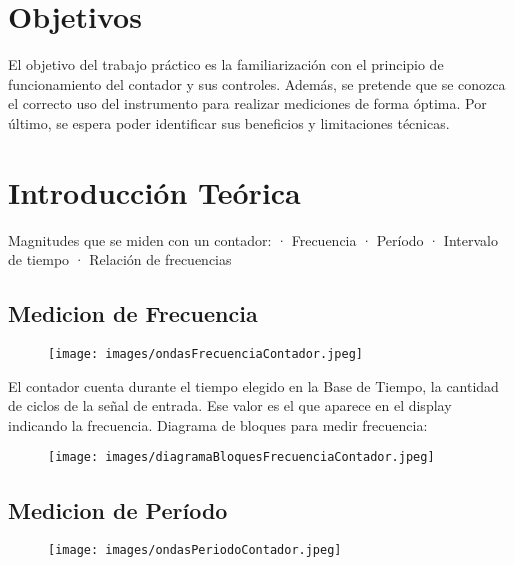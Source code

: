 \documentclass{article}
\begin{document}
\section{Objetivos}

	El objetivo del trabajo práctico es la familiarización con el principio de funcionamiento del contador y sus controles. Además, se pretende que se conozca el correcto uso del instrumento para realizar mediciones de forma óptima. Por último, se espera poder identificar sus beneficios y limitaciones técnicas.
\bigskip\bigskip




\section{Introducción Teórica}

	Magnitudes que se miden con un contador:
	· Frecuencia
	· Período
	· Intervalo de tiempo
	· Relación de frecuencias
	
	
\subsection{Medicion de Frecuencia}
	
		\begin{figure}[h]
			\centering
			\texttt{[image: images/ondasFrecuenciaContador.jpeg]}
			\medskip
		\end{figure}
		\bigskip\bigskip

	El contador cuenta durante el tiempo elegido en la Base de Tiempo, la cantidad de ciclos de la señal de entrada. Ese valor es el que aparece en el display indicando la frecuencia.
	\medskip
	Diagrama de bloques para medir frecuencia:
	
	\begin{figure}[h]
				\centering
				\texttt{[image: images/diagramaBloquesFrecuenciaContador.jpeg]}
				\medskip
	\end{figure}
	\bigskip\bigskip
	
\subsection {Medicion de Período}
		
	\begin{figure}[h]
		\centering
		\texttt{[image: images/ondasPeriodoContador.jpeg]}
		\medskip
	\end{figure}
	\bigskip\bigskip
	
\end{document}

